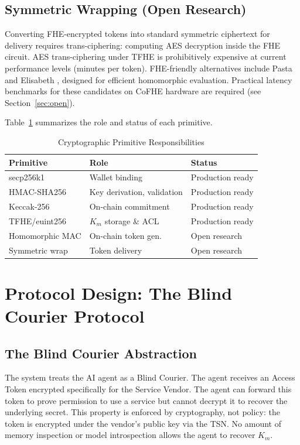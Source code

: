 \documentclass[conference]{IEEEtran}
\begin{document}
\subsection{Symmetric Wrapping (Open Research)}
Converting FHE-encrypted tokens into standard symmetric ciphertext for delivery requires
trans-ciphering: computing AES decryption inside the FHE circuit. AES trans-ciphering
under TFHE is prohibitively expensive at current performance levels (minutes per token).
FHE-friendly alternatives include Pasta \cite{pasta} and Elisabeth \cite{elisabeth},
designed for efficient homomorphic evaluation. Practical latency benchmarks for these
candidates on CoFHE hardware are required (see Section~\ref{sec:open}).

Table~\ref{tab:primitives} summarizes the role and status of each primitive.

\begin{table}[h]
\caption{Cryptographic Primitive Responsibilities}
\label{tab:primitives}
\renewcommand{\arraystretch}{1.2}
\begin{tabular}{p{1.8cm}p{2.0cm}p{2.2cm}}
\toprule
\textbf{Primitive} & \textbf{Role} & \textbf{Status} \\
\midrule
secp256k1 & Wallet binding & Production ready \\
HMAC-SHA256 & Key derivation, validation & Production ready \\
Keccak-256 & On-chain commitment & Production ready \\
TFHE/euint256 & $K_m$ storage \& ACL & Production ready \\
Homomorphic MAC & On-chain token gen. & Open research \\
Symmetric wrap & Token delivery & Open research \\
\bottomrule
\end{tabular}
\end{table}

\section{Protocol Design: The Blind Courier Protocol}
\label{sec:protocol}

\subsection{The Blind Courier Abstraction}
The system treats the AI agent as a Blind Courier. The agent receives an Access Token
encrypted specifically for the Service Vendor. The agent can forward this token to
prove permission to use a service but cannot decrypt it to recover the underlying
secret. This property is enforced by cryptography, not policy: the token is encrypted
under the vendor's public key via the TSN. No amount of memory inspection or model
introspection allows the agent to recover $K_m$.
\end{document}
